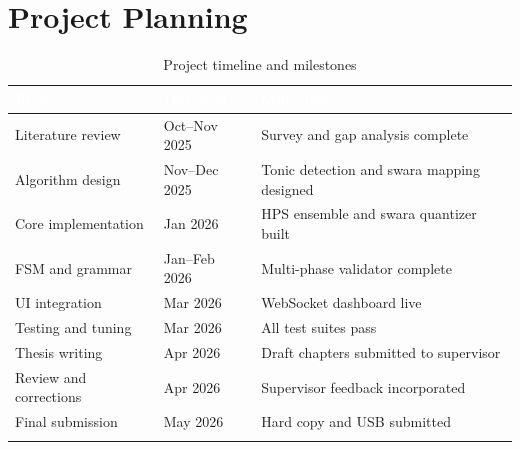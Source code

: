 \documentclass[12pt,a4paper]{report}
\numberwithin{equation}{chapter}
\begin{document}
\section{Project Planning}
\begin{table}[htbp]
\centering
\caption{Project timeline and milestones}
\label{tab:gantt}
\setlength{\arrayrulewidth}{0.4pt}
\renewcommand{\arraystretch}{1.35}
\small
\begin{tabular}{>{\raggedright\arraybackslash}p{4.2cm}
                >{\centering\arraybackslash}p{3.2cm}
                >{\raggedright\arraybackslash}p{5.8cm}}
\arrayrulecolor{tableheadbg}
\toprule
\rowcolor{tableheadbg}
\textcolor{white}{\textbf{Phase}} &
\textcolor{white}{\textbf{Duration}} &
\textcolor{white}{\textbf{Milestone}} \\
\midrule
\arrayrulecolor{black!15}
\rowcolor{tablerowA}
Literature review        & Oct--Nov 2025    & Survey and gap analysis complete \\
\rowcolor{tablerowB}
Algorithm design         & Nov--Dec 2025    & Tonic detection and swara mapping designed \\
\rowcolor{tablerowA}
Core implementation      & Jan 2026    & HPS ensemble and swara quantizer built \\
\rowcolor{tablerowB}
FSM and grammar          & Jan--Feb 2026    & Multi-phase validator complete \\
\rowcolor{tablerowA}
UI integration           & Mar 2026    & WebSocket dashboard live \\
\rowcolor{tablerowB}
Testing and tuning       & Mar 2026    & All test suites pass \\
\rowcolor{tablerowA}
Thesis writing           & Apr 2026    & Draft chapters submitted to supervisor \\
\rowcolor{tablerowB}
Review and corrections   & Apr 2026           & Supervisor feedback incorporated \\
\rowcolor{tablerowA}
Final submission         & May 2026           & Hard copy and USB submitted \\
\arrayrulecolor{tableheadbg}
\bottomrule
\end{tabular}
\end{table}
\end{document}
